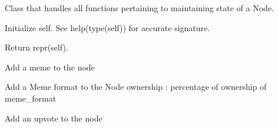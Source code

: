 \documentclass[letterpaper,10pt,english]{sphinxmanual}
\begin{document}
\begin{fulllineitems}
\label{\detokenize{index:node_state.Node}}
Class that handles all functions pertaining to maintaining state
of a Node.

\begin{fulllineitems}
\label{\detokenize{index:node_state.Node.__init__}}
Initialize self.  See help(type(self)) for accurate signature.

\end{fulllineitems}


\begin{fulllineitems}
\label{\detokenize{index:node_state.Node.__repr__}}
Return repr(self).

\end{fulllineitems}


\begin{fulllineitems}
\label{\detokenize{index:node_state.Node.add_meme}}
Add a meme to the node

\end{fulllineitems}


\begin{fulllineitems}
\label{\detokenize{index:node_state.Node.add_meme_format}}
Add a Meme format to the Node
ownership : percentage of ownership of meme\_format

\end{fulllineitems}


\begin{fulllineitems}
\label{\detokenize{index:node_state.Node.add_upvote}}
Add an upvote to the node

\end{fulllineitems}


\end{fulllineitems}
\end{document}
